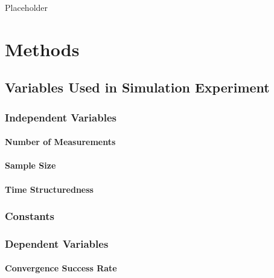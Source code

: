 \documentclass[
12pt, %
twoside,
english]{guelphthesis}
\begin{document}
Placeholder

\hypertarget{methods-2}{%
\section{Methods}\label{methods-2}}

\hypertarget{variables-used-in-simulation-experiment-2}{%
\subsection{Variables Used in Simulation Experiment}\label{variables-used-in-simulation-experiment-2}}

\hypertarget{independent-variables-2}{%
\subsubsection{Independent Variables}\label{independent-variables-2}}

\hypertarget{number-of-measurements-2}{%
\paragraph{Number of Measurements}\label{number-of-measurements-2}}

\hypertarget{sample-size-1}{%
\paragraph{Sample Size}\label{sample-size-1}}

\hypertarget{time-structuredness-1}{%
\paragraph{Time Structuredness}\label{time-structuredness-1}}

\hypertarget{constants-1}{%
\subsubsection{Constants}\label{constants-1}}

\hypertarget{dependent-variables-2}{%
\subsubsection{Dependent Variables}\label{dependent-variables-2}}

\hypertarget{convergence-success-rate-1}{%
\paragraph{Convergence Success Rate}\label{convergence-success-rate-1}}
\end{document}
